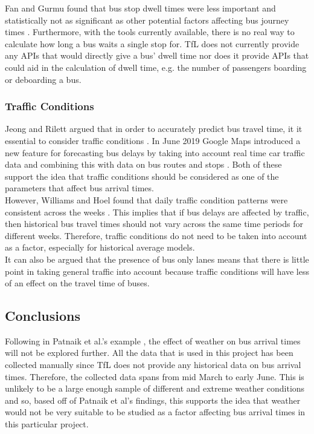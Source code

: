 Fan and Gurmu found that bus stop dwell times were less important and statistically not as significant as other potential factors affecting bus journey times \cite{dynamic-gps}. Furthermore, with the tools currently available, there is no real way to calculate how long a bus waits a single stop for. TfL does not currently provide any APIs that would directly give a bus' dwell time nor does it provide APIs that could aid in the calculation of dwell time, e.g. the number of passengers boarding or deboarding a bus. 

\subsubsection{Traffic Conditions}

Jeong and Rilett argued that in order to accurately predict bus travel time, it it essential to consider traffic conditions \cite{ann-prediction}. In June 2019 Google Maps introduced a new feature for forecasting bus delays by taking into account real time car traffic data and combining this with data on bus routes and stops \cite{google-machine-learning}. Both of these support the idea that traffic conditions should be considered as one of the parameters that affect bus arrival times. \\

However, Williams and Hoel found that daily traffic condition patterns were consistent across the weeks \cite{consistent-traffic}. This implies that if bus delays are affected by traffic, then historical bus travel times should not vary across the same time periods for different weeks. Therefore, traffic conditions do not need to be taken into account as a factor, especially for historical average models. \\

It can also be argued that the presence of bus only lanes means that there is little point in taking general traffic into account because traffic conditions will have less of an effect on the travel time of buses.

\subsection{Conclusions}

Following in Patnaik et al.'s example \cite{apc-estimation}, the effect of weather on bus arrival times will not be explored further. All the data that is used in this project has been collected manually since TfL does not provide any historical data on bus arrival times. Therefore, the collected data spans from mid March to early June. This is unlikely to be a large enough sample of different and extreme weather conditions and so, based off of Patnaik et al's findings, this supports the idea that weather would not be very suitable to be studied as a factor affecting bus arrival times in this particular project. \\

